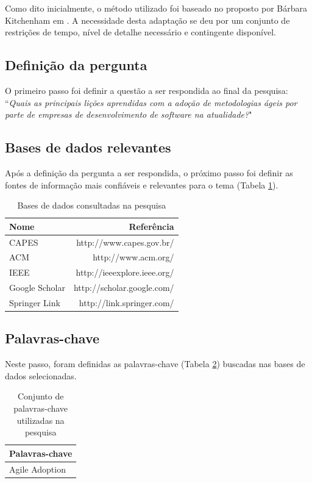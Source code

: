 		Como dito inicialmente, o método utilizado foi baseado no proposto por Bárbara Kitchenham em \cite{Barbara04}. A necessidade desta adaptação se deu por um conjunto de restrições de tempo, nível de detalhe necessário e contingente disponível.
		
		\subsection{Definição da pergunta}
			O primeiro passo foi definir a questão a ser respondida ao final da pesquisa: ``\textit{Quais as principais lições aprendidas com a adoção de metodologias ágeis por parte de empresas de desenvolvimento de software na atualidade?}"
		\subsection{Bases de dados relevantes}
			Após a definição da pergunta a ser respondida, o próximo passo foi definir as fontes de informação mais confiáveis e relevantes para o tema (Tabela \ref{tab:basesDeDados}).
			\begin{table}[H]
				\centering
				\begin{tabular}{| l | r |} \hline \textbf{Nome} & \textbf{Referência} \\ \hline
					CAPES & http://www.capes.gov.br/ \\ \hline
					ACM & http://www.acm.org/ \\ \hline
					IEEE & http://ieeexplore.ieee.org/ \\ \hline
					Google Scholar & http://scholar.google.com/ \\ \hline
					Springer Link & http://link.springer.com/ \\ \hline
				\end{tabular}
				\caption{Bases de dados consultadas na pesquisa}
				\label{tab:basesDeDados}
			\end{table}
		\subsection{Palavras-chave}
			Neste passo, foram definidas as palavras-chave (Tabela \ref{tab:palavrasChave}) buscadas nas bases de dados selecionadas.
			\begin{table}[H]
				\centering
				\begin{tabular}{| l |} \hline \textbf{Palavras-chave} \\ \hline
					Agile Adoption \\ \hline
				\end{tabular}
				\caption{Conjunto de palavras-chave utilizadas na pesquisa}
				\label{tab:palavrasChave}
			\end{table}
